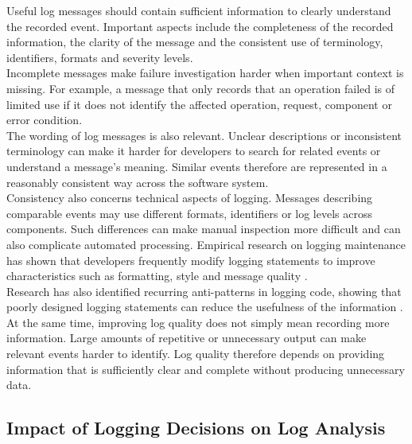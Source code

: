 Useful log messages should contain sufficient information to clearly understand the recorded event.
Important aspects include the completeness of the recorded information, the clarity of the message 
and the consistent use of terminology, identifiers, formats and severity levels.
\\
Incomplete messages make failure investigation harder when important context is missing. 
For example, a message that only records that an operation failed is of limited use if it does 
not identify the affected operation, request, component or error condition.
\\
The wording of log messages is also relevant. Unclear descriptions or inconsistent terminology 
can make it harder for developers to search for related events or understand a message's meaning.
Similar events therefore are represented in a reasonably consistent way across the software system.
\\
Consistency also concerns technical aspects of logging. 
Messages describing comparable events may use different formats, identifiers or log levels across components.
Such differences can make manual inspection more difficult and can also complicate automated processing. 
Empirical research on logging maintenance has shown that developers frequently modify logging statements 
to improve characteristics such as formatting, style and message quality \cite{chen2017characterizingloggingpractices}.
\\
Research has also identified recurring anti-patterns in logging code, showing that poorly designed logging 
statements can reduce the usefulness of the information  \cite{chen2017characterizinganddetectingantipatterns}.
\\
At the same time, improving log quality does not simply mean recording more information. 
Large amounts of repetitive or unnecessary output can make relevant events harder to identify. 
Log quality therefore depends on providing information that is sufficiently clear and complete without producing unnecessary data.

\subsection{Impact of Logging Decisions on Log Analysis}
\label{subsec:logging_analysis_relationship}


